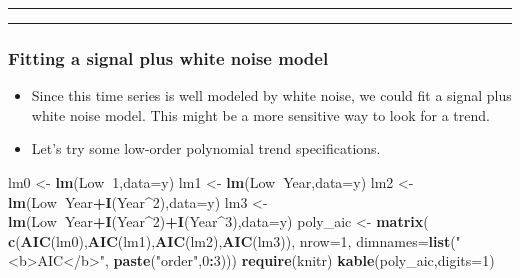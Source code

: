 \documentclass[]{article}
\newenvironment{Shaded}{\begin{snugshade}}{\end{snugshade}}
\newcommand{\KeywordTok}[1]{\textcolor[rgb]{0.13,0.29,0.53}{\textbf{#1}}}
\newcommand{\DataTypeTok}[1]{\textcolor[rgb]{0.13,0.29,0.53}{#1}}
\newcommand{\DecValTok}[1]{\textcolor[rgb]{0.00,0.00,0.81}{#1}}
\newcommand{\StringTok}[1]{\textcolor[rgb]{0.31,0.60,0.02}{#1}}
\newcommand{\OperatorTok}[1]{\textcolor[rgb]{0.81,0.36,0.00}{\textbf{#1}}}
\newcommand{\NormalTok}[1]{#1}
\begin{document}
\begin{center}\rule{0.5\linewidth}{\linethickness}\end{center}

\begin{center}\rule{0.5\linewidth}{\linethickness}\end{center}

\subsubsection{Fitting a signal plus white noise
model}\label{fitting-a-signal-plus-white-noise-model}

\begin{itemize}
\item
  Since this time series is well modeled by white noise, we could fit a
  signal plus white noise model. This might be a more sensitive way to
  look for a trend.
\item
  Let's try some low-order polynomial trend specifications.
\end{itemize}

\begin{Shaded}
\begin{Highlighting}[]
\NormalTok{lm0 <-}\StringTok{ }\KeywordTok{lm}\NormalTok{(Low}\OperatorTok{~}\DecValTok{1}\NormalTok{,}\DataTypeTok{data=}\NormalTok{y)}
\NormalTok{lm1 <-}\StringTok{ }\KeywordTok{lm}\NormalTok{(Low}\OperatorTok{~}\NormalTok{Year,}\DataTypeTok{data=}\NormalTok{y)}
\NormalTok{lm2 <-}\StringTok{ }\KeywordTok{lm}\NormalTok{(Low}\OperatorTok{~}\NormalTok{Year}\OperatorTok{+}\KeywordTok{I}\NormalTok{(Year}\OperatorTok{^}\DecValTok{2}\NormalTok{),}\DataTypeTok{data=}\NormalTok{y)}
\NormalTok{lm3 <-}\StringTok{ }\KeywordTok{lm}\NormalTok{(Low}\OperatorTok{~}\NormalTok{Year}\OperatorTok{+}\KeywordTok{I}\NormalTok{(Year}\OperatorTok{^}\DecValTok{2}\NormalTok{)}\OperatorTok{+}\KeywordTok{I}\NormalTok{(Year}\OperatorTok{^}\DecValTok{3}\NormalTok{),}\DataTypeTok{data=}\NormalTok{y)}
\NormalTok{poly_aic <-}\StringTok{ }\KeywordTok{matrix}\NormalTok{( }\KeywordTok{c}\NormalTok{(}\KeywordTok{AIC}\NormalTok{(lm0),}\KeywordTok{AIC}\NormalTok{(lm1),}\KeywordTok{AIC}\NormalTok{(lm2),}\KeywordTok{AIC}\NormalTok{(lm3)), }\DataTypeTok{nrow=}\DecValTok{1}\NormalTok{,}
   \DataTypeTok{dimnames=}\KeywordTok{list}\NormalTok{(}\StringTok{"<b>AIC</b>"}\NormalTok{, }\KeywordTok{paste}\NormalTok{(}\StringTok{"order"}\NormalTok{,}\DecValTok{0}\OperatorTok{:}\DecValTok{3}\NormalTok{)))}
\KeywordTok{require}\NormalTok{(knitr)}
\KeywordTok{kable}\NormalTok{(poly_aic,}\DataTypeTok{digits=}\DecValTok{1}\NormalTok{)}
\end{Highlighting}
\end{Shaded}
\end{document}
